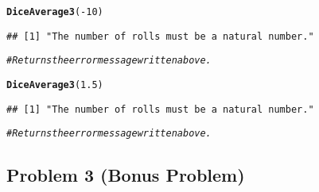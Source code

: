 \documentclass[12pt,letter]{article}\usepackage[]{graphicx}\usepackage[]{color}
\makeatletter
\newcommand{\hlnum}[1]{\textcolor[rgb]{0.686,0.059,0.569}{#1}}%
\newcommand{\hlcom}[1]{\textcolor[rgb]{0.678,0.584,0.686}{\textit{#1}}}%
\newcommand{\hlopt}[1]{\textcolor[rgb]{0,0,0}{#1}}%
\newcommand{\hlstd}[1]{\textcolor[rgb]{0.345,0.345,0.345}{#1}}%
\newcommand{\hlkwd}[1]{\textcolor[rgb]{0.737,0.353,0.396}{\textbf{#1}}}%
\newenvironment{kframe}{%
 \def\at@end@of@kframe{}%
 \ifinner\ifhmode%
  \def\at@end@of@kframe{\end{minipage}}%
  \begin{minipage}{\columnwidth}%
 \fi\fi%
 \def\FrameCommand##1{\hskip\@totalleftmargin \hskip-\fboxsep
 \colorbox{shadecolor}{##1}\hskip-\fboxsep
     \hskip-\linewidth \hskip-\@totalleftmargin \hskip\columnwidth}%
 \MakeFramed {\advance\hsize-\width
   \@totalleftmargin\z@ \linewidth\hsize
   \@setminipage}}%
 {\par\unskip\endMakeFramed%
 \at@end@of@kframe}
\newenvironment{knitrout}{}{} %
\makeatother
\begin{document}
\begin{knitrout}
\begin{kframe}
\begin{alltt}
\hlkwd{DiceAverage3}\hlstd{(}\hlopt{-}\hlnum{10}\hlstd{)}
\end{alltt}
\begin{verbatim}
## [1] "The number of rolls must be a natural number."
\end{verbatim}
\begin{alltt}
\hlcom{# Returns the error message written above.}

\hlkwd{DiceAverage3}\hlstd{(}\hlnum{1.5}\hlstd{)}
\end{alltt}
\begin{verbatim}
## [1] "The number of rolls must be a natural number."
\end{verbatim}
\begin{alltt}
\hlcom{# Returns the error message written above.}
\end{alltt}
\end{kframe}
\end{knitrout}



\subsection*{Problem 3 (Bonus Problem)}
\end{document}
